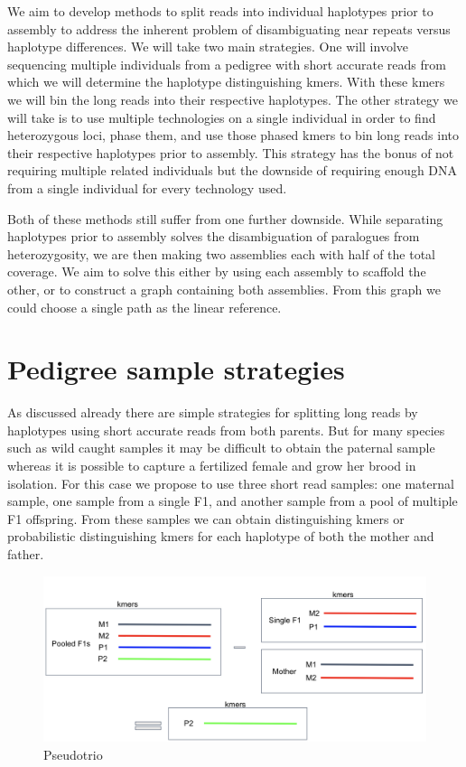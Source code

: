 We aim to develop methods to split reads into individual haplotypes prior to assembly to address the inherent problem of 
disambiguating near repeats versus haplotype differences. We will take two main strategies. One will involve sequencing multiple 
individuals from a pedigree with short accurate reads from which we will determine the haplotype distinguishing kmers.  With these kmers we  
will bin the long reads into their respective haplotypes. The other strategy we will take is to use multiple technologies on a single individual 
in order to find heterozygous loci, phase them, and use those phased kmers to bin long reads into their respective haplotypes prior to 
assembly. This strategy has the bonus of not requiring multiple related individuals but  the downside of requiring enough DNA from a single individual for every technology used.

Both of these methods still suffer from one further downside. While separating haplotypes prior to assembly solves the disambiguation of paralogues 
from heterozygosity, we are then making two assemblies each with half of the total coverage. We aim to solve this either by using each assembly 
to scaffold the other, or to construct a graph containing both assemblies. From this graph we could choose a single path as the linear reference.


\section{Pedigree sample strategies}
As discussed already there are simple strategies for splitting long reads by haplotypes using short accurate reads from both parents. 
But for many species such as wild caught samples it may be difficult to obtain the paternal sample whereas it is possible to capture a 
fertilized female and grow her brood in isolation. For this case we propose to use three short read samples: one maternal sample, one sample 
from a single F1, and another sample from a pool of multiple F1 offspring. From these samples we can obtain distinguishing kmers or probabilistic 
distinguishing kmers for each haplotype of both the mother and father.

\begin{figure}[h!]
\caption{Pseudotrio}
\label{figure:pseudotrio}
\begin{centering}
\includegraphics[width=\textwidth]{pseudotrio.png}
\end{centering}
\end{figure}


